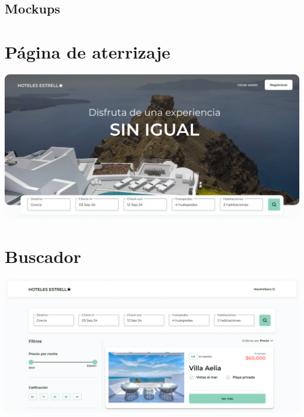 \subsection*{\bfseries Mockups }

\section*{\bfseries\LARGE Página de aterrizaje }
\begin{center}
    \includegraphics[scale=0.34]{img/landingPage.png}  
\end{center}


\section*{\bfseries\LARGE Buscador}
\begin{center}
    \includegraphics[scale=0.32]{img/buscador.png}  
\end{center}

